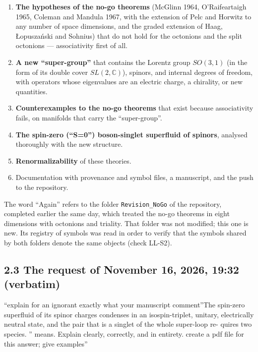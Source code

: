 \documentclass[
  10pt,
]{article}
\providecommand{\tightlist}{%
  \setlength{\itemsep}{0pt}\setlength{\parskip}{0pt}}
\begin{document}
\begin{enumerate}
\def\labelenumi{\arabic{enumi}.}
\tightlist
\item
  \textbf{The hypotheses of the no-go theorems} (McGlinn 1964,
  O'Raifeartaigh 1965, Coleman and Mandula 1967, with the extension of
  Pelc and Horwitz to any number of space dimensions, and the graded
  extension of Haag, Łopuszański and Sohnius) that do not hold for the
  octonions and the split octonions --- associativity first of all.
\item
  \textbf{A new ``super-group''} that contains the Lorentz group
  \(SO(3,1)\) (in the form of its double cover \(SL(2,\mathbb C)\)),
  spinors, and internal degrees of freedom, with operators whose
  eigenvalues are an electric charge, a chirality, or new quantities.
\item
  \textbf{Counterexamples to the no-go theorems} that exist because
  associativity fails, on manifolds that carry the ``super-group''.
\item
  \textbf{The spin-zero (``S=0'') boson-singlet superfluid of spinors},
  analysed thoroughly with the new structure.
\item
  \textbf{Renormalizability} of these theories.
\item
  Documentation with provenance and symbol files, a manuscript, and the
  push to the repository.
\end{enumerate}

The word ``Again'' refers to the folder \texttt{Revision\_NoGo} of the
repository, completed earlier the same day, which treated the no-go
theorems in eight dimensions with octonions and triality. That folder
was not modified; this one is new. Its registry of symbols was read in
order to verify that the symbols shared by both folders denote the same
objects (check LL-S2).

\hypertarget{the-request-of-november-16-2026-1932-verbatim}{%
\subsection{2.3 The request of November 16, 2026, 19:32
(verbatim)}\label{the-request-of-november-16-2026-1932-verbatim}}

``explain for an ignorant exactly what your manuscript comment''The
spin-zero superfluid of its spinor charges condenses in an
isospin-triplet, unitary, electrically neutral state, and the pair that
is a singlet of the whole super-loop re- quires two species. '' means.
Explain clearly, correctly, and in entirety. create a pdf file for this
answer; give examples''
\end{document}
